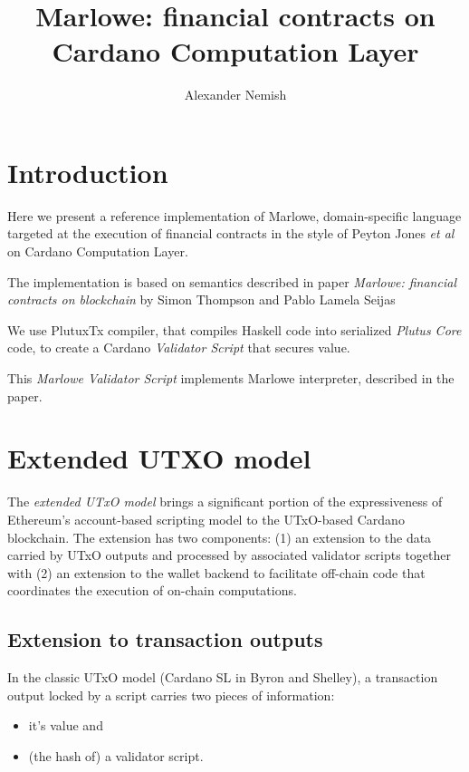 \documentclass[11pt,a4paper]{article}
\begin{document}
\title {Marlowe: financial contracts on Cardano Computation Layer}
\author{Alexander Nemish}

\maketitle

\section{Introduction}

Here we present a reference implementation of Marlowe, domain-specific language targeted at
the execution of financial contracts in the style of Peyton Jones \emph{et al}
on Cardano Computation Layer.

The implementation is based on semantics described in paper
\emph{Marlowe: financial contracts on blockchain} by Simon Thompson and Pablo Lamela Seijas

We use PlutuxTx compiler, that compiles Haskell code into serialized \emph{Plutus Core} code,
to create a Cardano \emph{Validator Script} that secures value.

This \emph{Marlowe Validator Script} implements Marlowe interpreter, described in the paper.

\section{Extended UTXO model}
The \emph{extended UTxO model} brings a significant portion of the expressiveness of
Ethereum’s account-based scripting model to the UTxO-based Cardano blockchain.
The extension has two components: (1) an extension to the data carried by UTxO outputs
and processed by associated validator scripts together with
(2) an extension to the wallet backend to facilitate off-chain code
that coordinates the execution of on-chain computations.

\subsection{Extension to transaction outputs}
In the classic UTxO model (Cardano SL in Byron and Shelley),
a transaction output locked by a script carries two pieces of information:

\begin{itemize}
\item it’s value and
\item (the hash of) a validator script.
\end{itemize}
\end{document}
